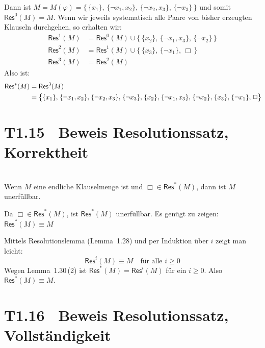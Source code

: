 \documentclass[fontsize=11pt, twoside=false, numbers=autoenddot]{scrbook}
\begin{document}
Dann ist $M = M(\varphi) = \big\{\, \{x_1\},\, \{\lnot x_1,x_2\},\, \{\lnot x_2,x_3\},\, \{\lnot x_3\}\, \big\}$
und somit $\textsf{Res}^0(M) = M$.
Wenn wir jeweils systematisch alle Paare von bisher erzeugten Klauseln durchgehen, so erhalten wir:
%
\begin{align*}
  \textsf{Res}^1(M) & = \textsf{Res}^0(M) \cup \big\{\, \{x_2\},\, \{\lnot x_1,x_3\},\, \{\lnot x_2\}\, \big\} \\
  \textsf{Res}^2(M) & = \textsf{Res}^1(M) \cup \big\{\, \{x_3\},\, \{\lnot x_1\},\, \Box\, \big\}              \\
  \textsf{Res}^3(M) & = \textsf{Res}^2(M)
\end{align*}
%
Also ist:
%
\begin{align*}
  \textsf{Res}^*(M) & = \textsf{Res}^3(M) \\
                    & = \big\{ \{x_1\},\;\! \{\lnot x_1,x_2\},\;\! \{\lnot x_2,x_3\},\;\! \{\lnot x_3\},\;\! \{x_2\},\;\! \{\lnot x_1,x_3\},\;\! \{\lnot x_2\},\;\!\{x_3\},\;\! \{\lnot x_1\},\;\! \Box \big\}\hspace*{-2pt}
\end{align*}

\newcommand{\TBewResSatzKorr}{T1.15}
\section*{\hypertarget{TBewResSatzKorr}{\TBewResSatzKorr}~ Beweis Resolutionssatz, Korrektheit}

~ \\
Wenn $M$ eine endliche Klauselmenge ist und $\Box \in \textsf{Res}^*(M)$,
dann ist $M$ unerfüllbar.

\par\noindent
\begin{beweis}
  Da $\Box \in \textsf{Res}^*(M)$, ist $\textsf{Res}^*(M)$ unerfüllbar.
  Es genügt zu zeigen: $\textsf{Res}^*(M) \equiv M$

  Mittels Resolutionslemma (Lemma~1.28) und per Induktion über $i$ zeigt man leicht:
  \[
    \textsf{Res}^i(M) \equiv M \quad\text{für alle~} i \geq 0
  \]
  Wegen Lemma~1.30\,(2) ist $\textsf{Res}^*(M) = \textsf{Res}^i(M)$ für ein $i \geq 0$.
  Also $\textsf{Res}^*(M) \equiv M$.
  \qedhere
\end{beweis}

\section*{T1.16~ Beweis Resolutionssatz, Vollständigkeit}
\end{document}
